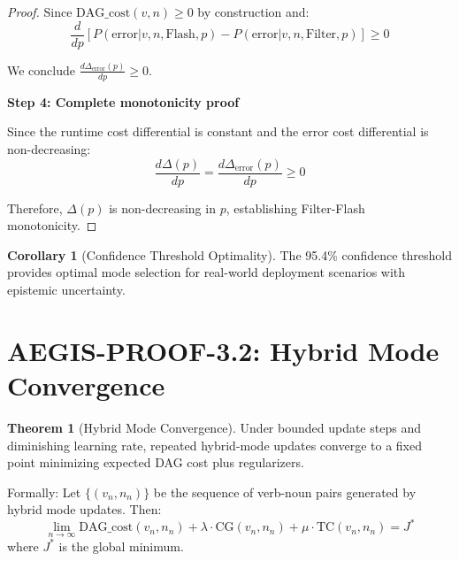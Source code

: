 \documentclass[11pt]{article}
\theoremstyle{definition}
\newtheorem{theorem}{Theorem}
\newtheorem{corollary}{Corollary}
\begin{document}
\begin{proof}
Since $\text{DAG\_cost}(v,n) \geq 0$ by construction and:
\begin{equation}
\frac{d}{dp}[P(\text{error} | v,n,\text{Flash},p) - P(\text{error} | v,n,\text{Filter},p)] \geq 0
\end{equation}

We conclude $\frac{d\Delta_{\text{error}}(p)}{dp} \geq 0$.

\textbf{Step 4: Complete monotonicity proof}

Since the runtime cost differential is constant and the error cost differential is non-decreasing:
\begin{equation}
\frac{d\Delta(p)}{dp} = \frac{d\Delta_{\text{error}}(p)}{dp} \geq 0
\end{equation}

Therefore, $\Delta(p)$ is non-decreasing in $p$, establishing Filter-Flash monotonicity.
\end{proof}

\begin{corollary}[Confidence Threshold Optimality]
The 95.4\% confidence threshold provides optimal mode selection for real-world deployment scenarios with epistemic uncertainty.
\end{corollary}

\section{AEGIS-PROOF-3.2: Hybrid Mode Convergence}

\begin{theorem}[Hybrid Mode Convergence]
\label{thm:convergence}
Under bounded update steps and diminishing learning rate, repeated hybrid-mode updates converge to a fixed point minimizing expected DAG cost plus regularizers.

Formally: Let $\{(v_n, n_n)\}$ be the sequence of verb-noun pairs generated by hybrid mode updates. Then:
\begin{equation}
\lim_{n \to \infty} \text{DAG\_cost}(v_n, n_n) + \lambda \cdot \text{CG}(v_n,n_n) + \mu \cdot \text{TC}(v_n,n_n) = J^*
\end{equation}
where $J^*$ is the global minimum.
\end{theorem}
\end{document}
